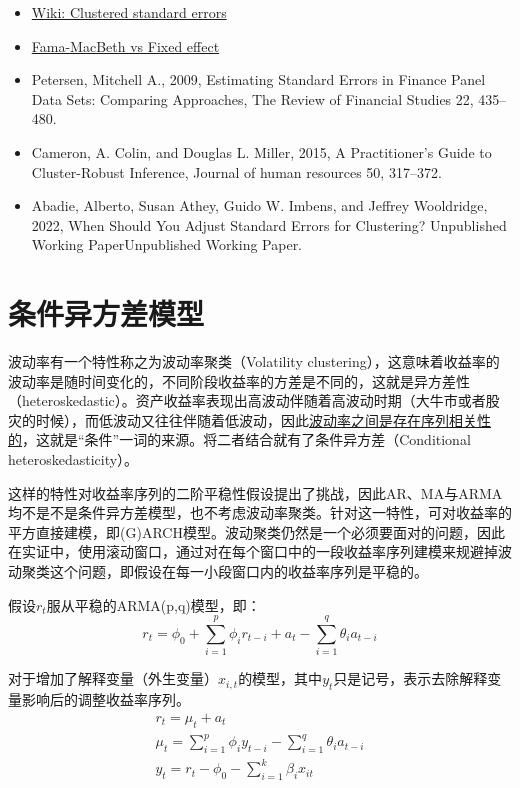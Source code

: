 \documentclass[11pt]{article}
\begin{document}
\begin{itemize}
    \item \href{https://en.wikipedia.org/wiki/Clustered\_standard\_errors}{Wiki: Clustered standard errors}
    \item \href{https://quant.stackexchange.com/questions/35756/fama-mac-beth-1973-vs-fixed-effect}{Fama-MacBeth vs Fixed effect}
    \item Petersen, Mitchell A., 2009, Estimating Standard Errors in Finance Panel Data Sets: Comparing Approaches, The Review of Financial Studies 22, 435–480.
    \item Cameron, A. Colin, and Douglas L. Miller, 2015, A Practitioner’s Guide to Cluster-Robust Inference, Journal of human resources 50, 317–372.
    \item Abadie, Alberto, Susan Athey, Guido W. Imbens, and Jeffrey Wooldridge, 2022, When Should You Adjust Standard Errors for Clustering? Unpublished Working PaperUnpublished Working Paper.
\end{itemize}

\section{条件异方差模型}

波动率有一个特性称之为波动率聚类（Volatility clustering），这意味着收益率的波动率是随时间变化的，不同阶段收益率的方差是不同的，这就是异方差性（heteroskedastic）。资产收益率表现出高波动伴随着高波动时期（大牛市或者股灾的时候），而低波动又往往伴随着低波动，因此\uline{波动率之间是存在序列相关性的}，这就是“条件”一词的来源。将二者结合就有了条件异方差（Conditional heteroskedasticity）。

这样的特性对收益率序列的二阶平稳性假设提出了挑战，因此AR、MA与ARMA均不是不是条件异方差模型，也不考虑波动率聚类。针对这一特性，可对收益率的平方直接建模，即(G)ARCH模型。波动聚类仍然是一个必须要面对的问题，因此在实证中，使用滚动窗口，通过对在每个窗口中的一段收益率序列建模来规避掉波动聚类这个问题，即假设在每一小段窗口内的收益率序列是平稳的。

假设$r_t$服从平稳的ARMA(p,q)模型，即：
\begin{equation*}
    r_t = \phi_0 + \sum_{i=1}^{p} \phi_i r_{t-i} + a_t - \sum_{i=1}^{q} \theta_i a_{t-i}
\end{equation*}

对于增加了解释变量（外生变量）$x_{i,t}$的模型，其中$y_t$只是记号，表示去除解释变量影响后的调整收益率序列。
\begin{gather*}
    r_t=\mu_t + a_t \\
    \mu_t = \sum_{i=1}^{p} \phi_i y_{t-i} - \sum_{i=1}^{q} \theta_i a_{t-i} \\
    y_t = r_t - \phi_0 - \sum_{i=1}^{k} \beta_i x_{it}
\end{gather*}
\end{document}
